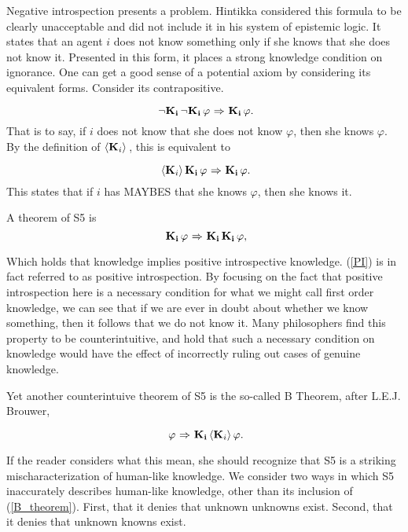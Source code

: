 Negative introspection presents a problem. Hintikka considered this formula to be clearly unacceptable and did not include it in his system of epistemic logic. It states that an agent $i$ does not know something only if she knows that she does not know it. Presented in this form, it places a strong knowledge condition on ignorance.  One can get a good sense of a potential axiom by considering its equivalent forms. Consider its contrapositive.

\begin{equation}~\label{NI_contra}
	{\neg}\mathbf{K}_{\mathbf{i}}\,{\neg}\mathbf{K}_{\mathbf{i}}\,\varphi {\ \Rightarrow \ } \mathbf{K}_{\mathbf{i}}\,\varphi.
\end{equation}
That is to say, if $i$ does not know that she does not know $\varphi$, then she knows $\varphi$. By the definition of $\langle \mathbf{K}_{i} \rangle\,$, this is equivalent to 

\begin{equation}~\label{NI_contra_POSS}
	\langle \mathbf{K}_{i} \rangle\,\mathbf{K}_{\mathbf{i}}\,\varphi{\ \Rightarrow \ } \mathbf{K}_{\mathbf{i}}\,\varphi.
\end{equation}
This states that if $i$ has MAYBES that she knows $\varphi$, then she knows it.

A theorem of S5 is
\begin{equation}~\label{PI}
	\mathbf{K}_{\mathbf{i}}\,\varphi {\ \Rightarrow \ } \mathbf{K}_{\mathbf{i}}\,\mathbf{K}_{\mathbf{i}}\,\varphi,
\end{equation}
 
Which holds that knowledge implies positive introspective knowledge. (\ref{PI}) is in fact referred to as positive introspection. By focusing on the fact that positive introspection here is a necessary condition for what we might call first order knowledge, we can see that if we are ever in doubt about whether we know something, then it follows that we do not know it. Many philosophers find this property to be counterintuitive, and hold that such a necessary condition on knowledge would have the effect of incorrectly ruling out cases of genuine knowledge.

Yet another counterintuive theorem of S5 is the so-called B Theorem, after L.E.J. Brouwer,

\begin{equation}~\label{B_theorem}
	\varphi {\ \Rightarrow \ } \mathbf{K}_{\mathbf{i}}\,\langle \mathbf{K}_{i} \rangle\,\varphi.
\end{equation}

If the reader considers what this mean, she should recognize that S5 is a striking mischaracterization of human-like knowledge. We consider two ways in which S5 inaccurately describes human-like knowledge, other than its inclusion of (\ref{B_theorem}). First, that it denies that unknown unknowns exist. Second, that it denies that unknown knowns exist.
